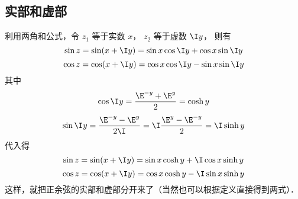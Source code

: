 \subsection{实部和虚部}
利用两角和公式，令 ${z_1}$ 等于实数 $x$，  ${z_2}$ 等于虚数 $\I y$， 则有
 \begin{equation}
\sin z = \sin(x + \I y) = \sin x\cos \I y + \cos x\sin \I y
\end{equation} 
\begin{equation}
\cos z = \cos(x + \I y) = \cos x\cos \I y - \sin x\sin \I y
\end{equation} 
其中
\begin{equation}
\cos \I y = \frac{\E^{ - y} + \E^y}{2} = \cosh y
\end{equation} 
\begin{equation}
\sin \I y = \frac{\E^{ - y} - \E^y}{2\I} = \I\frac{\E^y - \E^{ - y}}{2} = \I\sinh y
\end{equation} 
代入得
\begin{equation}
\sin z = \sin(x + \I y) = \sin x\cosh y + \I\cos x\sinh y
\end{equation} 
\begin{equation}
\cos z = \cos(x + \I y) = \cos x\cosh y - \I\sin x\sinh y
\end{equation}  
这样，就把正余弦的实部和虚部分开来了（当然也可以根据定义直接得到两式）．























